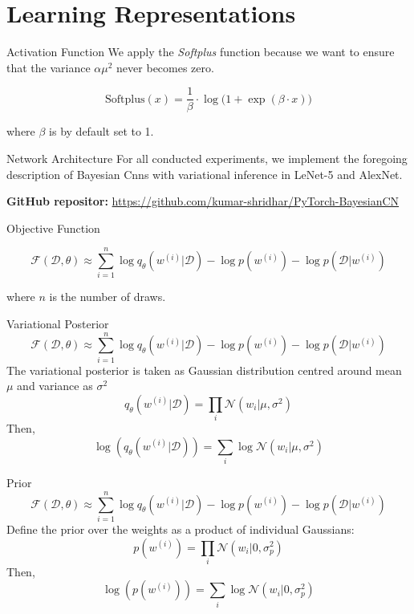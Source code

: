 \documentclass{beamer}
\begin{document}
\section{Learning Representations}
\begin{frame}{Activation Function}
  We apply the \textit{Softplus} function because we want to ensure that the variance $\alpha \mu^2$ never becomes zero.

  \begin{equation}
    \text{Softplus}(x) = \frac{1}{\beta} \cdot \log \big( 1 + \exp(\beta \cdot x) \big)
  \end{equation}

  where $\beta$ is by default set to 1.
\end{frame}
\begin{frame}{Network Architecture}
  For all conducted experiments, we implement the foregoing description of Bayesian Cnns with
  variational inference in LeNet-5 and AlexNet. 

  \textbf{GitHub repositor:} \url{https://github.com/kumar-shridhar/PyTorch-BayesianCN}
\end{frame}
\begin{frame}{Objective Function}

  \begin{equation}
    \mathcal{F}(\mathcal{D}, \theta) \approx \sum_{i = 1}^n \log q_\theta(w^{(i)}|\mathcal{D}) - \log p(w^{(i)}) - \log p(\mathcal{D}|w^{(i)})
  \end{equation}

  where $n$ is the number of draws.
\end{frame}
\begin{frame}{Variational Posterior}
  \[
    \mathcal{F}(\mathcal{D}, \theta) \approx \sum_{i = 1}^n \log q_\theta(w^{(i)}|\mathcal{D}) - \log p(w^{(i)}) - \log p(\mathcal{D}|w^{(i)})
  \]
  The variational posterior is taken as Gaussian distribution centred around mean $\mu$ and variance as $\sigma^2$
  \begin{equation}
    q_\theta(w^{(i)}|\mathcal{D}) = \prod_i \mathcal{N}(w_i|\mu, \sigma^2)
  \end{equation}
  Then,
  \begin{equation}
    \log(q_\theta(w^{(i)}|\mathcal{D})) = \sum_i \log \mathcal{N}(w_i|\mu, \sigma^2)
  \end{equation}
\end{frame}
\begin{frame}{Prior}
  \[
    \mathcal{F}(\mathcal{D}, \theta) \approx \sum_{i = 1}^n \log q_\theta(w^{(i)}|\mathcal{D}) - \log p(w^{(i)}) - \log p(\mathcal{D}|w^{(i)})
  \]
  Define the prior over the weights as a product of individual Gaussians:
  \begin{equation}
    p(w^{(i)}) = \prod_i \mathcal{N}(w_i|0, \sigma_p^2)
  \end{equation}
  Then,
  \begin{equation}
    \log(p(w^{(i)})) = \sum_i \log \mathcal{N}(w_i|0, \sigma_p^2)
  \end{equation}
\end{frame}
\end{document}
